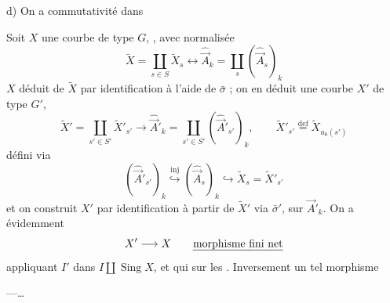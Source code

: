 \documentclass[11pt,a4paper]{article}
\begin{document}


d) On a commutativité dans



Soit $X$ une courbe de type $G$, , avec normalisée
\[
\tilde{X}=\coprod_{s\in S}\tilde{X}_s \longleftrightarrow \hat{\vec{A}}_k=\coprod_s(\hat{\vec{A}}_s)_k
\]
$X$ déduit de $\tilde{X}$ par identification à l'aide de $\bar\sigma$ ; on en déduit une courbe $X'$ de type $G'$, 
\[
\tilde{X}'=\coprod_{s'\in S'}\tilde{X}'_{s'} \longrightarrow \hat{\vec{A}}{}'_k=\coprod_{s'\in S'}(\hat{\vec{A}}{}'_{s'})_k,
\qquad
\tilde{X}'_{s'}\overset{\mathrm{def}}{=}\tilde{X}_{u_0(s')}
\]
défini via
\[
(\hat{\vec{A}}{}'_{s'})_k\overset{\mathrm{inj}}{\hookrightarrow}(\hat{\vec{A}}_s)_k\hookrightarrow\tilde{X}_s=\tilde{X}'_{s'}
\]
et on construit $X'$ par identification à partir de $\tilde{X}'$ via $\bar\sigma'$,   sur $\vec{A}'_k$. On a évidemment
\[
X'\longrightarrow X \qquad \text{\emph{morphisme fini net}}
\]
appliquant $I'$ dans $I\amalg\operatorname{Sing}X$, et qui sur les    . Inversement \ill{} \ill{} un tel morphisme

---…
\end{document}
